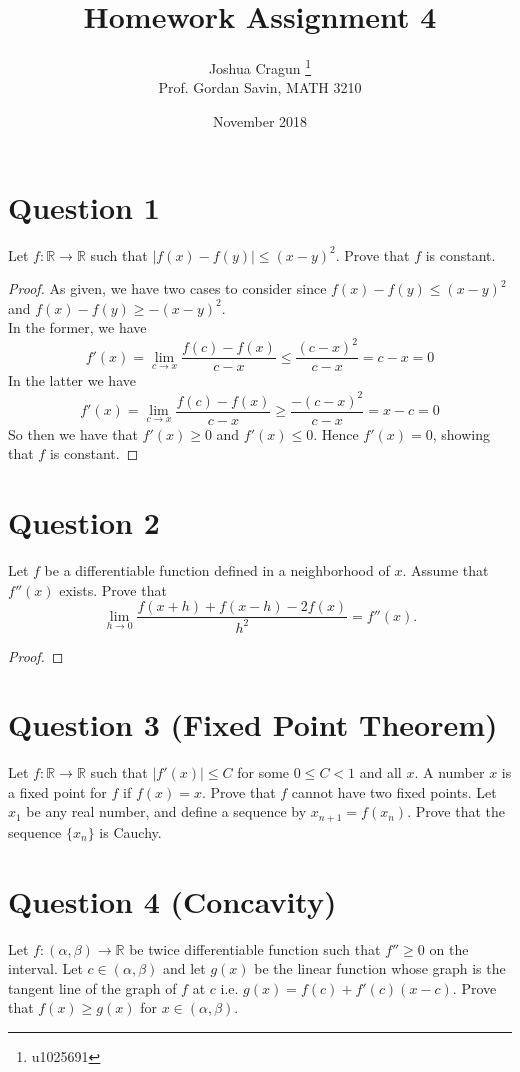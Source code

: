 \documentclass[12pt, letterpaper]{article}
\title{Homework Assignment 4}
\author{Joshua Cragun \thanks{u1025691} \\ Prof. Gordan Savin, MATH 3210}
\date{November 2018}
\begin{document}
\begin{titlepage}
\maketitle
\end{titlepage}

\section*{Question 1}
Let $f: \mathbb R \rightarrow \mathbb R$ such that $|f(x)-f(y)| \leq (x-y)^2$. Prove that $f$ is constant.

\begin{proof}
  As given, we have two cases to consider since $f(x)-f(y) \leq (x-y)^2$ and $f(x)-f(y) \geq -(x-y)^2$.\\

  \noindent In the former, we have
  $$ f'(x) = \lim_{c \to x} \frac{f(c) - f(x)}{c - x} \leq \frac{(c-x)^2}{c-x} = c-x = 0$$
  \noindent In the latter we have
  $$ f'(x) = \lim_{c \to x} \frac{f(c) - f(x)}{c - x} \geq \frac{-(c-x)^2}{c-x} = x-c = 0$$
  So then we have that $f'(x) \geq 0$ and $f'(x) \leq 0$. Hence $f'(x) = 0$, showing that $f$ is constant.
\end{proof}

\section*{Question 2}
Let $f$ be a differentiable function defined in a neighborhood of $x$. Assume  that $f''(x)$ exists. Prove that
\[
\lim_{h\rightarrow 0} \frac{f(x+h) + f(x-h) -2 f(x)}{h^2} = f''(x).
\]

\begin{proof}

\end{proof}
\section*{Question 3 (Fixed Point Theorem)}
Let $f: \mathbb R \rightarrow \mathbb R$ such that $|f'(x)| \leq C$ for some $0\leq C< 1$ and all $x$.  A number $x$ is a fixed point for $f$ if
$f(x)=x$. Prove that $f$ cannot have two fixed points.
Let $x_1$ be any real number, and define
a sequence by $x_{n+1}=f(x_n)$. Prove that the sequence $\{x_n\}$ is Cauchy.
\section*{Question 4 (Concavity)}
Let $f: (\alpha,\beta)  \rightarrow \mathbb R$ be twice differentiable function such that $f''\geq 0$ on the interval. Let $c\in (\alpha,\beta)$ and let $g(x)$ be the linear
function whose graph is the tangent line of the graph of $f$ at $c$ i.e. $g(x)=f(c) + f'(c)(x-c)$. Prove that $f(x)\geq g(x)$ for $x\in (\alpha,\beta)$.
\end{document}
